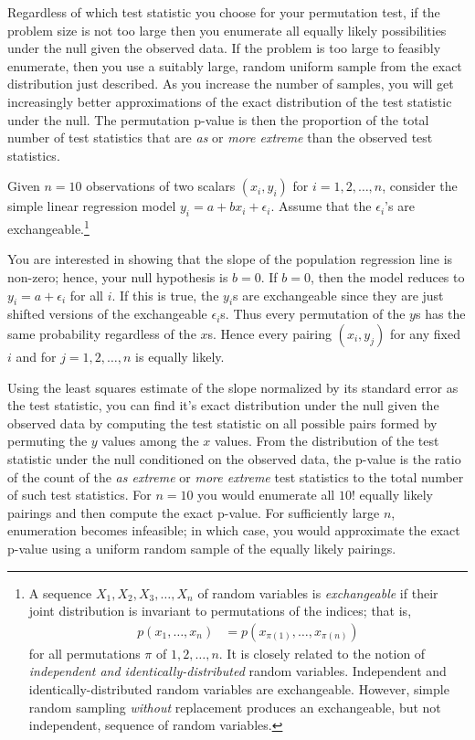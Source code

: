 \begin{example}[label=exa:cont]
Regardless of which test statistic you choose for your permutation test, if the
problem size is not too large then you enumerate all equally likely
possibilities under the null given the observed data.  If the problem is too
large to feasibly enumerate, then you use a suitably large, random uniform
sample from the exact distribution just described.  As you increase the number
of samples, you will get increasingly better approximations of the exact
distribution of the test statistic under the null.  The permutation p-value is
then the proportion of the total number of test statistics that are \emph{as}
or \emph{more extreme} than the observed test statistics.  \end{example}

\begin{example} Given $n=10$ observations of two scalars $(x_i, y_i)$ for
$i = 1, 2, \dots, n$, consider the simple linear regression model
$y_i = a + bx_i + \epsilon_i$.  Assume that the $\epsilon_i$'s are
exchangeable.\footnote{A sequence $X_1, X_2, X_3, \dots, X_n$ of random
variables is \emph{exchangeable} if their joint distribution is invariant to
permutations of the indices; that is,
\begin{align*}
p(x_1, \dots, x_n) &= p(x_{\pi(1)}, \dots, x_{\pi(n)})
\end{align*}
for all permutations $\pi$ of $1, 2, \dots, n$.  It is closely related to the
notion of \emph{independent and identically-distributed} random variables.
Independent and identically-distributed random variables are exchangeable.
However, simple random sampling \emph{without} replacement produces an
exchangeable, but not independent, sequence of random variables.}

You are interested in showing that the slope of the population regression line
is non-zero; hence, your null hypothesis is $b = 0$. If $b = 0$, then the model
reduces to $y_i = a + \epsilon_i$ for all $i$.  If this is true, the
$y_i$s are exchangeable since they are just shifted versions of the
exchangeable $\epsilon_i$s.  Thus every permutation of the $y$s has the same
probability regardless of the $x$s.  Hence every pairing
$(x_i, y_j)$ for any fixed $i$ and for $j = 1, 2, \dots, n$ is equally likely.

Using the least squares estimate of the slope normalized by its standard error
as the test statistic, you can find it's exact distribution under the null given
the observed data by computing the test statistic on all possible pairs
formed by permuting the $y$ values among the $x$ values.  From the distribution
of the test statistic under the null conditioned on the observed data, the
p-value is the ratio of the count of the \emph{as extreme} or \emph{more
extreme} test statistics to the total number of such test statistics. For
$n=10$ you would enumerate all $10!$ equally likely pairings and then compute
the exact p-value.  For sufficiently large $n$, enumeration becomes infeasible;
in which case, you would approximate the exact p-value using a uniform random
sample of the equally likely pairings.


\end{example}
